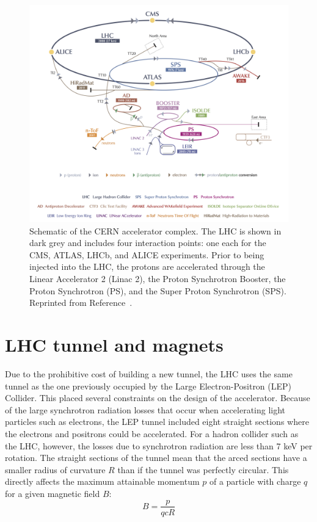 \begin{figure}[h!]
	\centering
	\includegraphics[width=\linewidth]{Figures/LHC/accelerator.jpg}
       \caption[Schematic of the CERN accelerator complex.]{Schematic of the CERN accelerator complex. The LHC is shown in dark grey and includes four interaction points: one each for the CMS, ATLAS, LHCb, and ALICE experiments. Prior to being injected into the LHC, the protons are accelerated through the Linear Accelerator 2 (Linac 2), the Proton Synchrotron Booster, the Proton Synchrotron (PS), and the Super Proton Synchrotron (SPS). Reprinted from Reference~\cite{CDS}.}
       \label{fig:accelerator}
\end{figure}

\section{LHC tunnel and magnets}
\label{sec:tunnel}

Due to the prohibitive cost of building a new tunnel, the LHC uses the same tunnel as the one previously occupied by the Large Electron-Positron (LEP) Collider. This placed several constraints on the design of the accelerator. Because of the large synchrotron radiation losses that occur when accelerating light particles such as electrons, the LEP tunnel included eight straight sections where the electrons and positrons could be accelerated. For a hadron collider such as the LHC, however, the losses due to synchrotron radiation are less than 7 keV per rotation. The straight sections of the tunnel mean that the arced sections have a smaller radius of curvature $R$ than if the tunnel was perfectly circular. This directly affects the maximum attainable momentum $p$ of a particle with charge $q$ for a given magnetic field $B$:
\begin{equation}
B = \frac{p}{qcR}
\end{equation}

